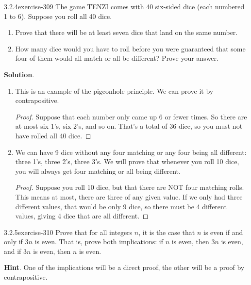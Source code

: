 \documentclass[twoside,11pt,]{book}
\numberwithin{equation}{chapter}
\begin{document}
\begin{divisionsolution}{3.2.4}{}{exercise-309}%
\hypertarget{p-4131}{}%
The game TENZI comes with 40 six-sided dice (each numbered 1 to 6). Suppose you roll all 40 dice.\leavevmode%
\begin{enumerate}[label=(\alph*)]
\item\hypertarget{li-2133}{}Prove that there will be at least seven dice that land on the same number.%
\item\hypertarget{li-2134}{}\hypertarget{p-4132}{}%
How many dice would you have to roll before you were guaranteed that some four of them would all match or all be different? Prove your answer.%
\end{enumerate}
%
\par\smallskip%
\noindent\textbf{Solution}.\quad%
\hypertarget{p-4133}{}%
\leavevmode%
\begin{enumerate}[label=(\alph*)]
\item\hypertarget{li-2135}{}\hypertarget{p-4134}{}%
This is an example of the pigeonhole principle. We can prove it by contrapositive.%
\begin{proof}{}
\hypertarget{p-4135}{}%
Suppose that each number only came up 6 or fewer times. So there are at most six 1's, six 2's, and so on. That's a total of 36 dice, so you must not have rolled all 40 dice.%
\end{proof}
\item\hypertarget{li-2136}{}\hypertarget{p-4136}{}%
We can have 9 dice without any four matching or any four being all different: three 1's, three 2's, three 3's. We will prove that whenever you roll 10 dice, you will always get four matching or all being different.%
\begin{proof}{}
\hypertarget{p-4137}{}%
Suppose you roll 10 dice, but that there are NOT four matching rolls. This means at most, there are three of any given value. If we only had three different values, that would be only 9 dice, so there must be 4 different values, giving 4 dice that are all different.%
\end{proof}
\end{enumerate}
%
\end{divisionsolution}%
\begin{divisionsolution}{3.2.5}{}{exercise-310}%
\hypertarget{p-4138}{}%
Prove that for all integers \(n\), it is the case that \(n\) is  even if and only if \(3n\) is even.  That is, prove both implications: if \(n\) is even, then \(3n\) is even, and if \(3n\) is even, then \(n\) is even.%
\par\smallskip%
\noindent\textbf{Hint}.\quad%
\hypertarget{p-4139}{}%
One of the implications will be a direct proof, the other will be a proof by contrapositive.%
\end{divisionsolution}%
\end{document}
